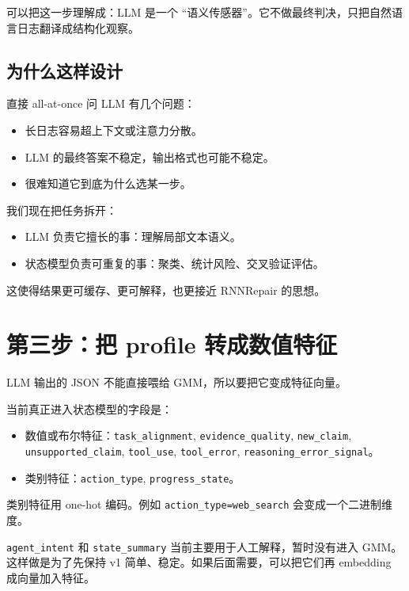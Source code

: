 \documentclass[UTF8,a4paper,11pt]{ctexart}
\begin{document}
可以把这一步理解成：LLM 是一个 ``语义传感器''。它不做最终判决，只把自然语言日志翻译成结构化观察。

\subsection{为什么这样设计}

直接 all-at-once 问 LLM 有几个问题：

\begin{itemize}
  \item 长日志容易超上下文或注意力分散。
  \item LLM 的最终答案不稳定，输出格式也可能不稳定。
  \item 很难知道它到底为什么选某一步。
\end{itemize}

我们现在把任务拆开：

\begin{itemize}
  \item LLM 负责它擅长的事：理解局部文本语义。
  \item 状态模型负责可重复的事：聚类、统计风险、交叉验证评估。
\end{itemize}

这使得结果更可缓存、更可解释，也更接近 RNNRepair 的思想。

\section{第三步：把 profile 转成数值特征}

LLM 输出的 JSON 不能直接喂给 GMM，所以要把它变成特征向量。

当前真正进入状态模型的字段是：

\begin{itemize}
  \item 数值或布尔特征：\texttt{task\_alignment}, \texttt{evidence\_quality}, \texttt{new\_claim}, \texttt{unsupported\_claim}, \texttt{tool\_use}, \texttt{tool\_error}, \texttt{reasoning\_error\_signal}。
  \item 类别特征：\texttt{action\_type}, \texttt{progress\_state}。
\end{itemize}

类别特征用 one-hot 编码。例如 \texttt{action\_type=web\_search} 会变成一个二进制维度。

\texttt{agent\_intent} 和 \texttt{state\_summary} 当前主要用于人工解释，暂时没有进入 GMM。这样做是为了先保持 v1 简单、稳定。如果后面需要，可以把它们再 embedding 成向量加入特征。
\end{document}
